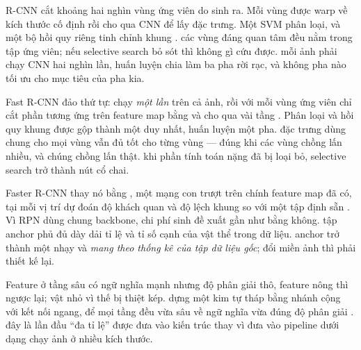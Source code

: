 \documentclass[../../../deep_learning.tex]{subfiles}
\begin{document}
\begin{mach}
\item {} \gp R-CNN cắt khoảng hai nghìn vùng ứng viên do  sinh ra. Mỗi vùng được warp về kích thước cố định rồi cho qua CNN để lấy đặc trưng. Một SVM phân loại, và một bộ hồi quy riêng tinh chỉnh khung \cite{girshick2014rcnn}. \gd các vùng đáng quan tâm đều nằm trong tập ứng viên; nếu selective search bỏ sót thì không gì cứu được. \gia mỗi ảnh phải chạy CNN hai nghìn lần, huấn luyện chia làm ba pha rời rạc, và không pha nào tối ưu cho mục tiêu của pha kia.
\item {} \gp Fast R-CNN đảo thứ tự: chạy  \emph{một lần} trên cả ảnh, rồi với mỗi vùng ứng viên chỉ cắt phần tương ứng trên feature map bằng  và cho qua vài tầng  \cite{girshick2015fast}. Phân loại và hồi quy khung được gộp thành một  duy nhất, huấn luyện một pha.
 \gd đặc trưng dùng chung cho mọi vùng vẫn đủ tốt cho từng vùng --- đúng khi các vùng chồng lấn nhiều, và chúng chồng lấn thật. \vdm khi phần tính toán nặng đã bị loại bỏ, selective search trở thành nút cổ chai.
\item {} \gp Faster R-CNN thay nó bằng , một mạng con trượt trên chính feature map đã có, tại mỗi vị trí dự đoán độ khách quan và độ lệch khung so với một tập  định sẵn \cite{ren2015faster}. Vì RPN dùng chung backbone, chi phí sinh đề xuất gần như bằng không. \gd tập anchor phủ đủ dày dải tỉ lệ và tỉ số cạnh của vật thể trong dữ liệu. \gia anchor trở thành một  nhạy và \emph{mang theo thống kê của tập dữ liệu gốc}; đổi miền ảnh thì phải thiết kế lại.
\item {} Feature ở tầng sâu có ngữ nghĩa mạnh nhưng độ phân giải thô, feature nông thì ngược lại; vật nhỏ vì thế bị thiệt kép. \gp {} dựng một kim tự tháp bằng nhánh  cộng với kết nối ngang, để mọi tầng đều vừa sâu về ngữ nghĩa vừa đúng độ phân giải \cite{lin2017fpn}. \hq đây là lần đầu ``đa tỉ lệ'' được đưa vào kiến trúc thay vì đưa vào pipeline dưới dạng chạy ảnh ở nhiều kích thước.

\end{mach}
\end{document}
